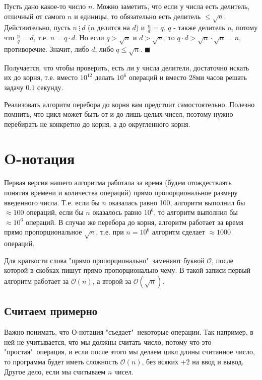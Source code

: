 \documentclass[12pt]{article} %
\def\O{\mathcal{O}}
\begin{document}
\begin{tcolorbox}[colback=blue!5!white,colframe=blue!75!black,title={Математическая справка. Делители числа.}]
	Пусть дано какое-то число $n$. Можно заметить, что если у числа есть делитель, отличный от самого $n$ и единицы, то обязательно есть делитель $\leq \sqrt{n}$. \\
	
	Действительно, пусть $n\ \vdots\ d$ ($n$ делится на $d$) и $\frac{n}{d} = q$. $q$ - также делитель $n$, потому что $\frac{n}{q} = d$, т.е. $n = q \cdot d$. Но если $q > \sqrt{n}$ и $d > \sqrt{n}$, то  $q \cdot d > \sqrt{n} \cdot \sqrt{n} = n$, противоречие. Значит, либо $d$, либо $q \leq \sqrt{n}$.  $\blacksquare$
\end{tcolorbox}

Получается, что чтобы проверить, есть ли у числа делители, достаточно искать их до корня, т.е. вместо $10^{12}$ делать $10^6$ операций и вместо 28ми часов решать задачу $0.1$ секунду.

Реализовать алгоритм перебора до корня вам предстоит самостоятельно. Полезно помнить, что цикл может быть от и до лишь целых чисел, поэтому нужно перебирать не конкретно до корня, а до округленного корня.

\section{O-нотация}
Первая версия нашего алгоритма работала за время (будем отождествлять понятия времени и количества операций) прямо пропорциональное размеру введенного числа. Т.е. если бы $n$ оказалась равно 100, алгоритм выполнил бы $\approx 100$ операций, если бы $n$ оказалось равно $10^6$, то алгоритм выполнил бы $\approx 10^6$ операций. В случае же перебора до корня, алгоритм работает за время прямо пропорциональное $\sqrt{n}$, т.е. при $n = 10^6$ алгоритм сделает $\approx 1000$ операций. 

Для краткости слова "прямо пропорционально"\ заменяют буквой $\O$, после которой в скобках пишут прямо пропорционально чему. В такой записи первый алгоритм работает за $\O(n)$, а второй за $\O(\sqrt{n})$.\\

\subsection{Считаем примерно}
Важно понимать, что О-нотация "съедает"\ некоторые операции. Так например, в ней не учитывается, что мы должны считать число, потому что это "простая"\ операция, и если после этого мы делаем цикл длины считанное число, то программа будет иметь сложность $\O(n)$, без всяких +2 на ввод и вывод. Другое дело, если мы считываем $n$ чисел.
\end{document}
